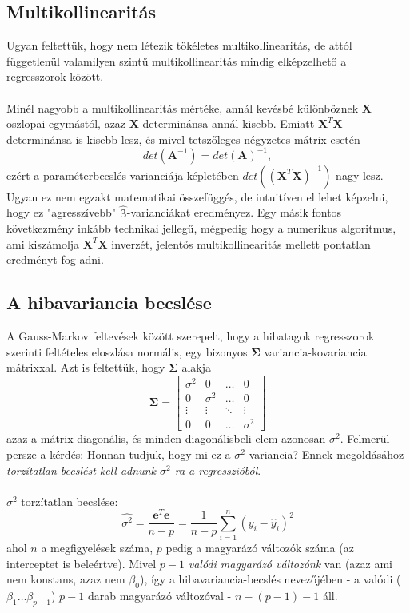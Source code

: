 \documentclass[14p]{report}
\def\pmb{\boldsymbol}
\def\ebeta{\hat{\pmb{\beta}}}
\begin{document}
	\subsection{Multikollinearitás}
	Ugyan feltettük, hogy nem létezik tökéletes multikollinearitás, de attól függetlenül valamilyen szintű multikollinearitás mindig elképzelhető a regresszorok között.
	\\
	\\
	Minél nagyobb a multikollinearitás mértéke, annál kevésbé különböznek $\pmb{X}$ oszlopai egymástól, azaz $\pmb{X}$ determinánsa annál kisebb. Emiatt $\pmb{X}^T\pmb{X}$ determinánsa is kisebb lesz, és mivel tetszőleges négyzetes mátrix esetén
	\[
		det(\pmb{A}^{-1}) = det(\pmb{A})^{-1},
	\]
	ezért a paraméterbecslés varianciája képletében $det((\pmb{X}^T\pmb{X})^{-1})$ nagy lesz. Ugyan ez nem egzakt matematikai összefüggés, de intuitíven el lehet képzelni, hogy ez "agresszívebb" $\ebeta$-varianciákat eredményez. Egy másik fontos következmény inkább technikai jellegű, mégpedig hogy a numerikus algoritmus, ami kiszámolja $\pmb{X}^T\pmb{X}$ inverzét, jelentős multikollinearitás mellett pontatlan eredményt fog adni. 
	
	\subsection{A hibavariancia becslése}
	A Gauss-Markov feltevések között szerepelt, hogy a hibatagok regresszorok szerinti feltételes eloszlása normális, egy bizonyos $\pmb{\Sigma}$ variancia-kovariancia mátrixxal. Azt is feltettük, hogy $\pmb{\Sigma}$ alakja
	\[
	\pmb{\Sigma} =
	\begin{bmatrix}
		\sigma^2 & 0 & \dots & 0 \\
		0 & \sigma^2 & \dots & 0 \\
		\vdots & \vdots & \ddots & \vdots \\
		0 & 0 & \dots & \sigma^2
	\end{bmatrix}
	\]
	azaz a mátrix diagonális, és minden diagonálisbeli elem azonosan $\sigma^2$. Felmerül persze a kérdés: Honnan tudjuk, hogy mi ez a $\sigma^2$ variancia? Ennek megoldásához \emph{torzítatlan becslést kell adnunk $\sigma^2$-ra a regresszióból}.
	\\
	\\
	$\sigma^2$ torzítatlan becslése:
	\[
	\widehat{\sigma^2} = \frac{\pmb{e}^T\pmb{e}}{n-p} = \frac{1}{n-p}\sum_{i=1}^{n}{(y_i - \hat{y}_i)^2}
	\]
	ahol $n$ a megfigyelések száma, $p$ pedig a magyarázó változók száma (az interceptet is beleértve). Mivel $p-1$ \emph{valódi magyarázó változónk} van (azaz ami nem konstans, azaz nem $\beta_0$), így a hibavariancia-becslés nevezőjében - a valódi ($\beta_1 \dots \beta_{p-1}$) $p-1$ darab magyarázó változóval - $n-(p-1)-1$ áll.
	
\end{document}
